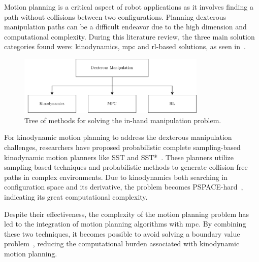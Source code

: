 Motion planning is a critical aspect of robot applications as it involves finding a path without collisions between two configurations. Planning dexterous manipulation paths can be a difficult endeavor due to the high dimension and computational complexity. During this literature review, the three main solution categories found were: kinodynamics, \gls{mpc} and \gls{rl}-based solutions, as seen in~. \medskip

\begin{figure}[h]
	\begin{small}
		\begin{center}
			\includegraphics[width=0.8\textwidth]{chapters/state-of-the-art/fig/categories-dex-man.pdf}
		\end{center}
		\caption{Tree of methods for solving the in-hand manipulation problem.}
		\label{fig:dm-categories}
	\end{small}
\end{figure}

For kinodynamic motion planning to address the dexterous manipulation challenges, researchers have proposed probabilistic complete sampling-based kinodynamic motion planners like SST and SST*~\cite{asymptotically-optimal-sampling-based-kinodynamic-planning}. These planners utilize sampling-based techniques and probabilistic methods to generate collision-free paths in complex environments. Due to kinodynamics both searching in configuration space and its derivative, the problem becomes PSPACE-hard~\cite*{planning-algorithms}, indicating its great computational complexity. \medskip

Despite their effectiveness, the complexity of the motion planning problem has led to the integration of motion planning algorithms with \gls{mpc}. By combining these two techniques, it becomes possible to avoid solving a boundary value problem~\cite{mpc-mpnet-model-predictive-motion-planning-networks-for-fast-near-optimal-planning-under-kinodynamic-constraints}, reducing the computational burden associated with kinodynamic motion planning. \medskip

